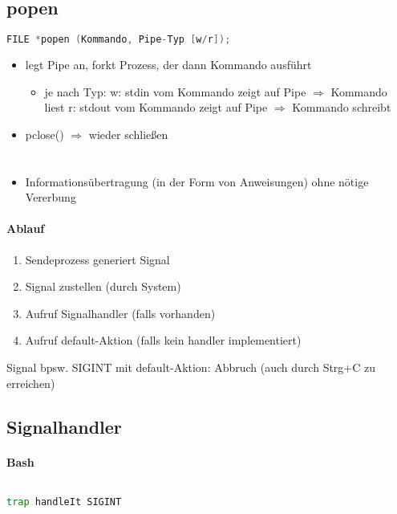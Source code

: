 \subsection{popen}
\begin{lstlisting}[language=C]
FILE *popen (Kommando, Pipe-Typ [w/r]);
\end{lstlisting}
\begin{itemize}
\item legt Pipe an, forkt Prozess, der dann Kommando ausführt
\begin{itemize}
\item je nach Typ:
w: stdin vom Kommando zeigt auf Pipe $\Rightarrow$ Kommando liest
r: stdout vom Kommando zeigt auf Pipe $\Rightarrow$ Kommando schreibt
\end{itemize}
\item pclose() $\Rightarrow$ wieder schließen
\end{itemize}

\section[Signale]{}
\begin{itemize}
\item Informationsübertragung (in der Form von Anweisungen) ohne nötige Vererbung
\end{itemize}
\paragraph{Ablauf}
\begin{enumerate}
\item Sendeprozess generiert Signal
\item Signal zustellen (durch System)
\item Aufruf Signalhandler (falls vorhanden)
\item Aufruf default-Aktion (falls kein handler implementiert)
\end{enumerate}
Signal bpsw. SIGINT mit default-Aktion: Abbruch (auch durch Strg+C zu erreichen)
\subsection{Signalhandler}
\paragraph{Bash} $ $
\begin{lstlisting}[language=bash]
trap handleIt SIGINT
\end{lstlisting}

